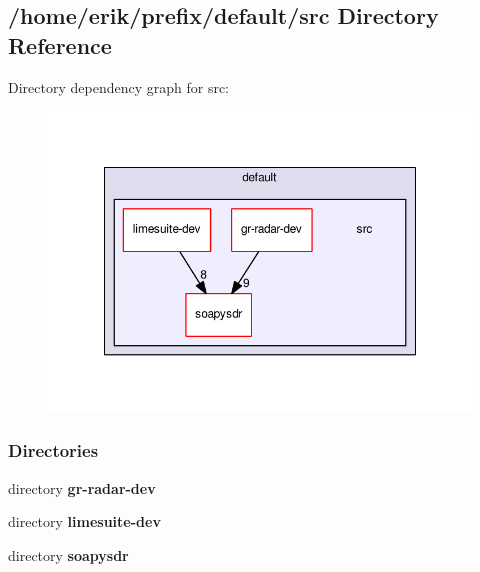 \subsection{/home/erik/prefix/default/src Directory Reference}
\label{dir_b4804201d5ae79dd9b765c673f6732d6}
Directory dependency graph for src\+:
\nopagebreak
\begin{figure}[H]
\begin{center}
\leavevmode
\includegraphics[width=350pt]{dir_b4804201d5ae79dd9b765c673f6732d6_dep}
\end{center}
\end{figure}
\subsubsection*{Directories}
\begin{DoxyCompactItemize}
\item 
directory {\bf gr-\/radar-\/dev}
\item 
directory {\bf limesuite-\/dev}
\item 
directory {\bf soapysdr}
\end{DoxyCompactItemize}

